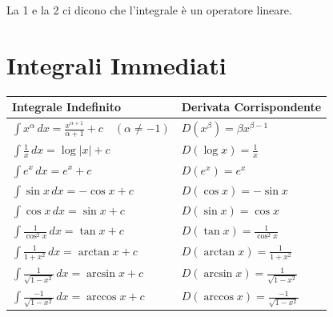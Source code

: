 La 1 e la 2 ci dicono che l'integrale è un operatore lineare.



\section{Integrali Immediati}

\begin{center}
\renewcommand{\arraystretch}{1.5} %
\begin{tabular}{ll}
    \hline
    \textbf{Integrale Indefinito} & \textbf{Derivata Corrispondente} \\
    \hline
    $\displaystyle \int x^\alpha \, dx = \frac{x^{\alpha +1}}{\alpha+1} + c \quad (\alpha \neq -1)$ & $\displaystyle D(x^\beta) = \beta x^{\beta -1}$ \\
    $\displaystyle \int \frac{1}{x} \, dx = \log\lvert x\rvert + c$ & $\displaystyle D(\log x) = \frac{1}{x}$ \\
    $\displaystyle \int e^x \, dx = e^x + c$ & $\displaystyle D(e^x) = e^x$ \\
    $\displaystyle \int \sin x \, dx = -\cos x + c$ & $\displaystyle D(\cos x) = -\sin x$ \\
    $\displaystyle \int \cos x \, dx = \sin x + c$ & $\displaystyle D(\sin x) = \cos x$ \\
    $\displaystyle \int \frac{1}{\cos^2 x} \, dx = \tan x + c$ & $\displaystyle D(\tan x) = \frac{1}{\cos^2 x}$ \\
    $\displaystyle \int \frac{1}{1+x^2} \, dx = \arctan x + c$ & $\displaystyle D(\arctan x) = \frac{1}{1+x^2}$ \\
    $\displaystyle \int \frac{1}{\sqrt{1-x^2}} \, dx = \arcsin x + c$ & $\displaystyle D(\arcsin x) = \frac{1}{\sqrt{1-x^2}}$ \\
    $\displaystyle \int \frac{-1}{\sqrt{1-x^2}} \, dx = \arccos x + c$ & $\displaystyle D(\arccos x) = \frac{-1}{\sqrt{1-x^2}}$ \\
    \hline
\end{tabular}
\end{center}

